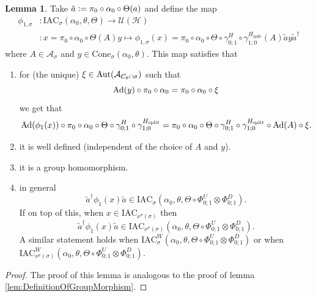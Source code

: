 \documentclass[12pt,a4paper,twoside]{article}
\newcommand{\IAC}{\textrm{IAC}}
\newcommand{\defeq}{\vcentcolon=}
\let\originalleft\left
\let\originalright\right
\renewcommand{\left}{\mathopen{}\mathclose\bgroup\originalleft}
\renewcommand{\right}{\aftergroup\egroup\originalright}
\newcommand{\UU}{\mathcal U}
\newcommand{\HH}{\mathcal H}
\renewcommand{\AA}{\mathcal A}
\newcommand{\Ad}[1]{\textrm{Ad}\left(#1\right)}
\newcommand{\Aut}[1]{\textrm{Aut}\left(#1\right)}
\theoremstyle{definition}
\newtheorem{lemma}[theorem]{Lemma}
\numberwithin{equation}{section}
\begin{document}
\begin{lemma}\label{lem:DefinitionOfGroupMorphismTwoTranslations}
	Take $\tilde{a}\defeq \pi_0\circ\alpha_0\circ\Theta(a)$ and define the map
	\begin{align}
		\phi_{1,\sigma}&:\IAC_{\sigma}(\alpha_0,\theta,\Theta) \rightarrow \UU(\HH)\\
		\nonumber
		&:x=\pi_0\circ\alpha_0\circ\Theta(A)y\mapsto \phi_{1,\sigma}(x)=\pi_0\circ\alpha_0\circ\Theta\circ\gamma^H_{0;1}\circ\gamma^{H_{\text{split}}}_{1;0}(A)\tilde{a}y\tilde{a}^\dagger
	\end{align}
	where $A\in\AA_{\sigma}$ and $y\in\textrm{Cone}_{\sigma}(\alpha_0,\theta)$. This map satisfies that
	\begin{enumerate}
		\item  for (the unique) $\xi\in\Aut{\AA_{C_\theta\cap \sigma}}$ such that
		\begin{equation}
			\Ad{y}\circ\pi_0\circ\alpha_0=\pi_0\circ\alpha_0\circ\xi
		\end{equation}
		we get that
		\begin{equation}\label{eq:ConditionDefinitionOfGroupMorphismTwoTranslations}
			\Ad{\phi_1(x)}\circ\pi_0\circ\alpha_0\circ\Theta\circ\gamma^H_{0;1}\circ\gamma^{H_{\text{split}}}_{1;0}=\pi_0\circ\alpha_0\circ\Theta\circ\gamma^H_{0;1}\circ\gamma^{H_{\text{split}}}_{1;0}\circ\Ad{A}\circ\xi.
		\end{equation}
		\item it is well defined (independent of the choice of $A$ and $y$).
		\item it is a group homomorphism.
		\item in general
			\begin{equation}
				\tilde{a}^\dagger\phi_1(x)\tilde{a}\in\IAC_\sigma(\alpha_0,\theta,\Theta\circ \Phi^U_{0;1}\otimes\Phi^D_{0;1}).
			\end{equation}
			If on top of this, when $x\in\IAC_{\nu^\sigma(\sigma)}$ then
			\begin{equation}
				\tilde{a}^\dagger\phi_1(x)\tilde{a}\in\IAC_{\nu^\sigma(\sigma)}(\alpha_0,\theta,\Theta\circ \Phi^U_{0;1}\otimes\Phi^D_{0;1}).
			\end{equation}
			A similar statement holds when $\IAC_{\sigma}^W(\alpha_0,\theta,\Theta\circ \Phi^U_{0;1}\otimes\Phi^D_{0;1})$ or when $\IAC_{\nu^\sigma(\sigma)}^W(\alpha_0,\theta,\Theta\circ \Phi^U_{0;1}\otimes\Phi^D_{0;1})$.
	\end{enumerate}
\end{lemma}
\begin{proof}
	The proof of this lemma is analogous to the proof of lemma \ref{lem:DefinitionOfGroupMorphism}.
\end{proof}
\end{document}
